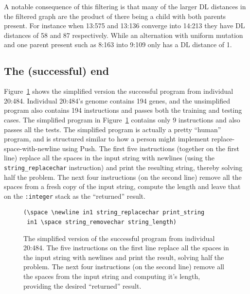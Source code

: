 A notable consequence of this filtering is that many of the larger DL distances in
the filtered graph are the product of there being a child with both parents present.
For instance when 13:575 and 13:136 converge into 14:213 they have DL distances of
58 and 87 respectively. While an alternation with uniform mutation and one parent present
such as 8:163 into 9:109 only has a DL distance of 1.

\subsection{The (successful) end}

Figure~\ref{prog:simplified20:484} 
shows the simplified version the successful program from 
individual 20:484. Individual 20:484's genome contains 194 genes, and the unsimplified 
program also contains 194 instructions and passes both
the training and testing cases. The simplified program in 
Figure~\ref{prog:simplified20:484} contains only 9 instructions and
also passes all the tests. 
The simplified program is actually a pretty ``human'' program, and is structured similar to 
how a person might implement replace-space-with-newline using Push. The first five 
instructions (together on the first line) replace all the spaces in the input string 
with newlines (using the \texttt{string\_replacechar} instruction) and print the 
resulting string, thereby solving half the problem. 
The next four instructions (on the second line) remove all the spaces from
a fresh copy of the input string, compute the length and leave that on the
\texttt{:integer} stack as the ``returned'' result.

\begin{figure}[tb]
\begin{verbatim}
(\space \newline in1 string_replacechar print_string
 in1 \space string_removechar string_length)
\end{verbatim}
\caption{The simplified version of the successful program from individual 20:484. The
	five instructions on the first line replace all the spaces in the input string with newlines
	and print the result, solving half the problem. The next four instructions (on the second
	line) remove all the spaces from the input string and computing it's length, providing
	the desired ``returned'' result.}
\label{prog:simplified20:484}
\end{figure}

